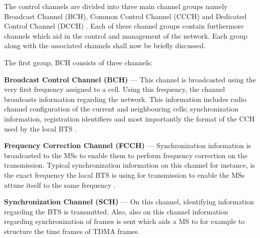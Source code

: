 The control channels are divided into three main channel groups namely Broadcast Channel (BCH), Common Control Channel (CCCH) and Dedicated Control Channel (DCCH) \cite{GSMArchitectureProtocolsServices}. Each of these channel groups contain furthermore channels which aid in the control and management of the network. Each group along with the associated channels shall now be briefly discussed.

The first group, BCH consists of three channels:
\begin{description}
\item{\textbf{Broadcast Control Channel (BCH)}} --- This channel is broadcasted using the very first frequency assigned to a cell. Using this frequency, the channel broadcasts information regarding the network. This information includes radio channel configuration of the current and neighbouring cells; synchronization information, registration identifiers and most importantly the format of the CCH used by the local BTS \cite{GSMArchitectureProtocolsServices}.
\item{\textbf{Frequency Correction Channel (FCCH)}} --- Synchronization information is broadcasted to the MSs to enable them to perform frequency correction on the transmission. Typical synchronization information on this channel for instance, is the exact frequency the local BTS is using for transmission to enable the MSs attune itself to the same frequency \cite{GSMArchitectureProtocolsServices}.
\item{\textbf{Synchronization Channel (SCH)}} --- On this channel, identifying information regarding the BTS is transmitted. Also, also on this channel information regarding synchronization of frames is sent which aids a MS to for example to structure the time frames of TDMA frames.
\end{description}

